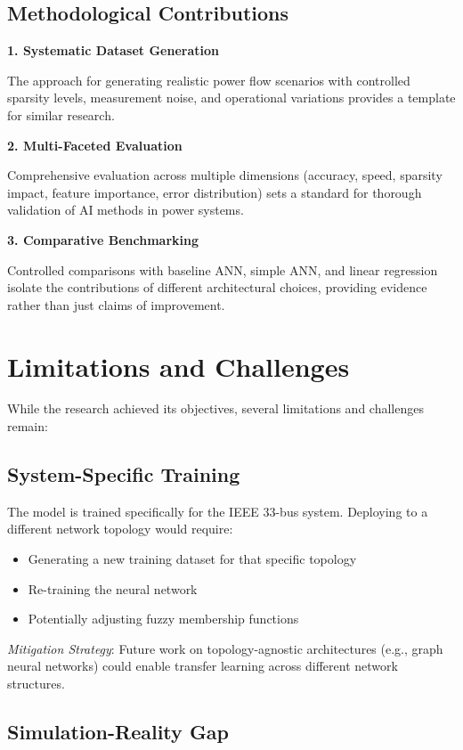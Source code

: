 \documentclass[12pt,a4paper]{report}
\begin{document}
\subsection{Methodological Contributions}

\textbf{1. Systematic Dataset Generation}

The approach for generating realistic power flow scenarios with controlled sparsity levels, measurement noise, and operational variations provides a template for similar research.

\textbf{2. Multi-Faceted Evaluation}

Comprehensive evaluation across multiple dimensions (accuracy, speed, sparsity impact, feature importance, error distribution) sets a standard for thorough validation of AI methods in power systems.

\textbf{3. Comparative Benchmarking}

Controlled comparisons with baseline ANN, simple ANN, and linear regression isolate the contributions of different architectural choices, providing evidence rather than just claims of improvement.

\section{Limitations and Challenges}

While the research achieved its objectives, several limitations and challenges remain:

\subsection{System-Specific Training}

The model is trained specifically for the IEEE 33-bus system. Deploying to a different network topology would require:
\begin{itemize}
    \item Generating a new training dataset for that specific topology
    \item Re-training the neural network
    \item Potentially adjusting fuzzy membership functions
\end{itemize}

\textit{Mitigation Strategy}: Future work on topology-agnostic architectures (e.g., graph neural networks) could enable transfer learning across different network structures.

\subsection{Simulation-Reality Gap}
\end{document}
